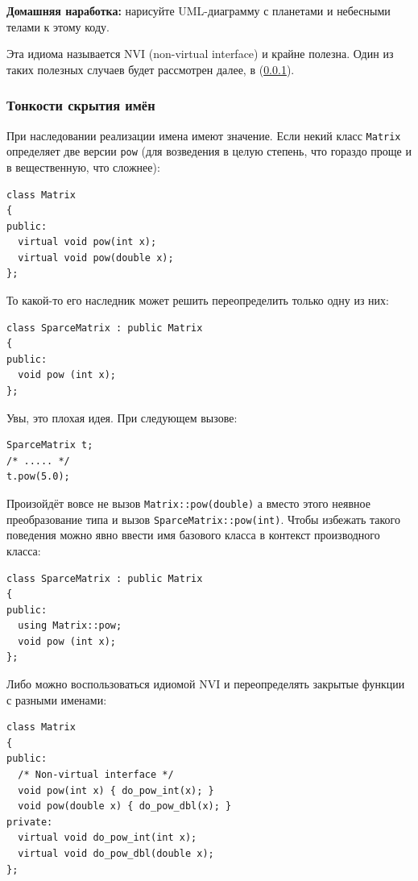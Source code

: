 \documentclass[a4paper,12pt,oneside]{article}
\begin{document}
\textbf{Домашняя наработка:} нарисуйте UML-диаграмму с планетами и небесными телами к этому коду.

Эта идиома называется NVI (non-virtual interface) и крайне полезна. Один из таких полезных случаев будет рассмотрен далее, в (\ref{NameHiding}).

\subsubsection{Тонкости скрытия имён}\label{NameHiding}

При наследовании реализации имена имеют значение. Если некий класс \lstinline!Matrix! определяет две версии \lstinline!pow! (для возведения в целую степень, что гораздо проще и в вещественную, что сложнее):

\begin{lstlisting}
class Matrix
{
public:
  virtual void pow(int x);
  virtual void pow(double x);
};
\end{lstlisting}

То какой-то его наследник может решить переопределить только одну из них:

\begin{lstlisting}
class SparceMatrix : public Matrix
{
public:
  void pow (int x);
};
\end{lstlisting}

Увы, это плохая идея. При следующем вызове:

\begin{lstlisting}
SparceMatrix t;
/* ..... */
t.pow(5.0);
\end{lstlisting}

Произойдёт вовсе не вызов \lstinline!Matrix::pow(double)! а вместо этого неявное преобразование типа и вызов \lstinline!SparceMatrix::pow(int)!. Чтобы избежать такого поведения можно явно ввести имя базового класса в контекст производного класса:

\begin{lstlisting}
class SparceMatrix : public Matrix
{
public:
  using Matrix::pow;
  void pow (int x);
};
\end{lstlisting}

Либо можно воспользоваться идиомой NVI и переопределять закрытые функции с разными именами:

\begin{lstlisting}
class Matrix
{
public:
  /* Non-virtual interface */
  void pow(int x) { do_pow_int(x); }
  void pow(double x) { do_pow_dbl(x); }
private:
  virtual void do_pow_int(int x);
  virtual void do_pow_dbl(double x);
};
\end{lstlisting}
\end{document}
